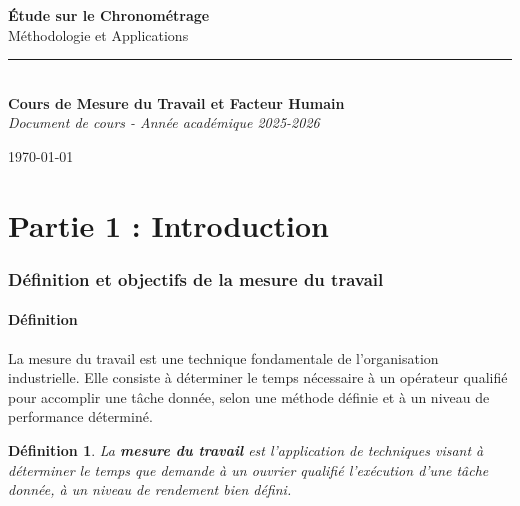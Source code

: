 \documentclass[a4paper,12pt]{article}
\newtheorem{definition}{Définition}[section]
\begin{document}
\begin{titlepage}
    \centering
    \vspace*{2cm}
    
    {\Huge \textbf{Étude sur le Chronométrage}}\\[0.5cm]
    {\Large Méthodologie et Applications}\\[1.5cm]
    
    \vfill
    
    \begin{minipage}{0.7\textwidth}
        \centering
        \rule{\textwidth}{0.5pt}\\[0.5cm]
        \textbf{Cours de Mesure du Travail et Facteur Humain}\\
        \vspace{0.3cm}
        \textit{Document de cours - Année académique 2025-2026}
    \end{minipage}
    
    \vfill
    
    {\large \today}
\end{titlepage}

\tableofcontents
\newpage

\part*{Partie 1 : Introduction}

\section{Définition et objectifs de la mesure du travail}

\subsection{Définition}

La mesure du travail est une technique fondamentale de l'organisation industrielle. Elle consiste à déterminer le temps nécessaire à un opérateur qualifié pour accomplir une tâche donnée, selon une méthode définie et à un niveau de performance déterminé.

\begin{definition}
La \textbf{mesure du travail} est l'application de techniques visant à déterminer le temps que demande à un ouvrier qualifié l'exécution d'une tâche donnée, à un niveau de rendement bien défini.
\end{definition}
\end{document}
